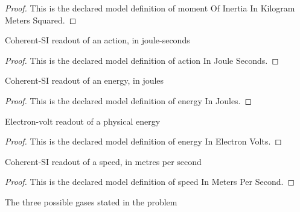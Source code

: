 \begin{proof}
  This is the declared model definition of moment Of Inertia In Kilogram Meters Squared.
\end{proof}
\begin{definition}
  \label{def:physics:phyx-mini-0631:phyxminiproblems-problemphyxmini0631-actioninjouleseconds}
  Coherent-SI readout of an action, in joule-seconds
\end{definition}
\begin{proof}
  This is the declared model definition of action In Joule Seconds.
\end{proof}
\begin{definition}
  \label{def:physics:phyx-mini-0631:phyxminiproblems-problemphyxmini0631-energyinjoules}
  Coherent-SI readout of an energy, in joules
\end{definition}
\begin{proof}
  This is the declared model definition of energy In Joules.
\end{proof}
\begin{definition}
  \label{def:physics:phyx-mini-0631:phyxminiproblems-problemphyxmini0631-energyinelectronvolts}
  Electron-volt readout of a physical energy
\end{definition}
\begin{proof}
  This is the declared model definition of energy In Electron Volts.
\end{proof}
\begin{definition}
  \label{def:physics:phyx-mini-0631:phyxminiproblems-problemphyxmini0631-speedinmeterspersecond}
  Coherent-SI readout of a speed, in metres per second
\end{definition}
\begin{proof}
  This is the declared model definition of speed In Meters Per Second.
\end{proof}
\begin{definition}
  \label{def:physics:phyx-mini-0631:phyxminiproblems-problemphyxmini0631-moleculecandidate}
  The three possible gases stated in the problem
\end{definition}

